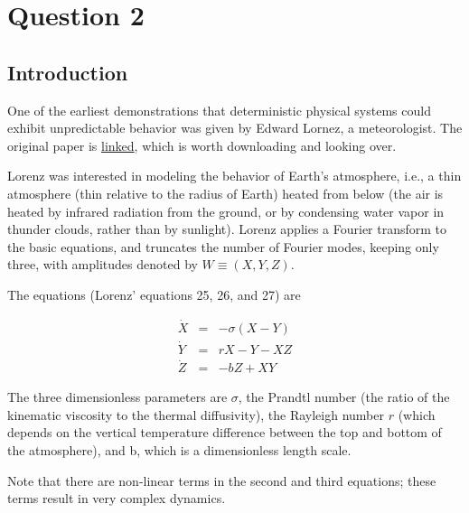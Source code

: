 \documentclass{article}
\begin{document}
\section*{Question 2}

\subsection*{Introduction}
One of the earliest demonstrations that deterministic physical systems could exhibit unpredictable behavior was given by Edward Lornez, a meteorologist. The original paper is \href{https://journals.ametsoc.org/view/journals/atsc/20/2/1520-0469_1963_020_0130_dnf_2_0_co_2.xml}{linked}, which is worth downloading and looking over.

Lorenz was interested in modeling the behavior of Earth's atmosphere, i.e., a thin atmosphere (thin relative to the radius of Earth) heated from below (the air is heated by infrared radiation from the ground, or by condensing water vapor in thunder clouds, rather than by sunlight). Lorenz applies a Fourier transform to the basic equations, and truncates the number of Fourier modes, keeping only three, with amplitudes denoted by $W\equiv(X, Y, Z)$.

The equations (Lorenz' equations 25, 26, and 27) are

\begin{eqnarray}
\dot X &=& -\sigma(X-Y)\\
\dot Y &=& rX -Y - XZ\\
\dot Z &=& -bZ + XY
\end{eqnarray}

The three dimensionless parameters are $\sigma$, the Prandtl number (the ratio of the kinematic viscosity to the thermal diffusivity), the Rayleigh number $r$ (which depends on the vertical temperature difference between the top and bottom of the atmosphere), and b, which is a dimensionless length scale.

Note that there are non-linear terms in the second and third equations;
these terms result in very complex dynamics.
\end{document}

